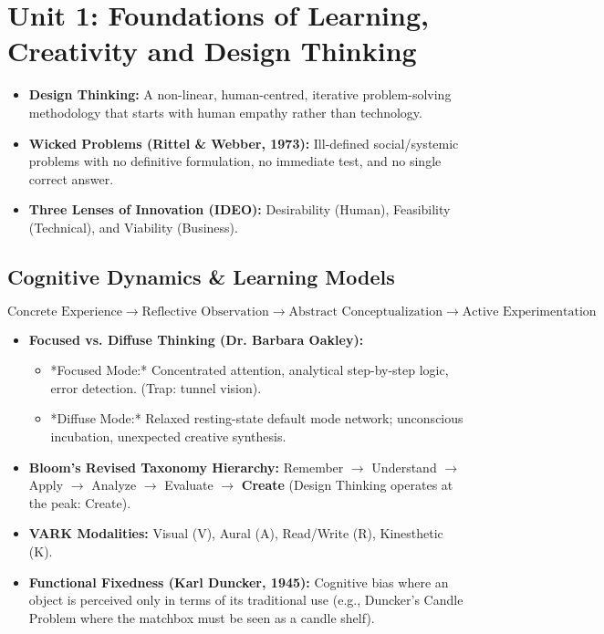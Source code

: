 \chapter{Unit 1: Foundations of Learning, Creativity and Design Thinking}
\label{chap:unit1_rev}

\begin{revbox}
\begin{itemize}[leftmargin=1.2em, itemsep=2pt]
    \item \textbf{Design Thinking:} A non-linear, human-centred, iterative problem-solving methodology that starts with human empathy rather than technology.
    \item \textbf{Wicked Problems (Rittel \& Webber, 1973):} Ill-defined social/systemic problems with no definitive formulation, no immediate test, and no single correct answer.
    \item \textbf{Three Lenses of Innovation (IDEO):} Desirability (Human), Feasibility (Technical), and Viability (Business).
\end{itemize}
\end{revbox}

\section{Cognitive Dynamics \& Learning Models}

\begin{formulabox}
\begin{equation*}
\text{Concrete Experience} \longrightarrow \text{Reflective Observation} \longrightarrow \text{Abstract Conceptualization} \longrightarrow \text{Active Experimentation}
\end{equation*}
\end{formulabox}

\begin{itemize}[leftmargin=1.2em, itemsep=3pt]
    \item \textbf{Focused vs. Diffuse Thinking (Dr. Barbara Oakley):}
    \begin{itemize}
        \item *Focused Mode:* Concentrated attention, analytical step-by-step logic, error detection. (Trap: tunnel vision).
        \item *Diffuse Mode:* Relaxed resting-state default mode network; unconscious incubation, unexpected creative synthesis.
    \end{itemize}
    \item \textbf{Bloom's Revised Taxonomy Hierarchy:} Remember $\rightarrow$ Understand $\rightarrow$ Apply $\rightarrow$ Analyze $\rightarrow$ Evaluate $\rightarrow$ \textbf{Create} (Design Thinking operates at the peak: Create).
    \item \textbf{VARK Modalities:} Visual (V), Aural (A), Read/Write (R), Kinesthetic (K).
    \item \textbf{Functional Fixedness (Karl Duncker, 1945):} Cognitive bias where an object is perceived only in terms of its traditional use (e.g., Duncker's Candle Problem where the matchbox must be seen as a candle shelf).
\end{itemize}

